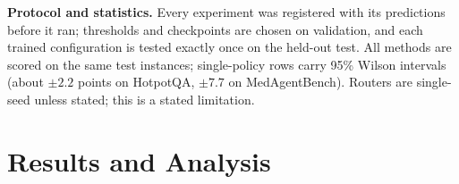 \documentclass{article}
\begin{document}
\textbf{Protocol and statistics.} Every experiment was registered with its predictions before it ran; thresholds and checkpoints are chosen on validation, and each trained configuration is tested exactly once on the held-out test. All methods are scored on the same test instances; single-policy rows carry 95\% Wilson intervals (about $\pm2.2$ points on HotpotQA, $\pm7.7$ on MedAgentBench). Routers are single-seed unless stated; this is a stated limitation.

\section{Results and Analysis}
\label{sec:results}
\end{document}
